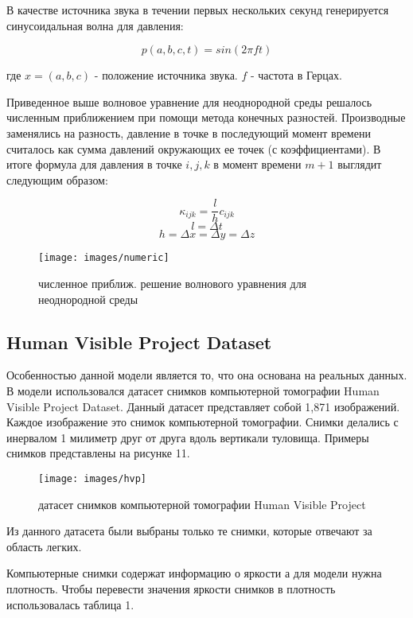 \documentclass[../main.tex]{subfiles}
\begin{document}
В качестве источника звука в течении первых нескольких секунд генерируется синусоидальная волна для давления:

$$p(a, b, c, t) = sin(2 \pi f t)$$

где $x = (a, b, c)$ - положение источника звука. $f$ - частота в Герцах.

Приведенное выше волновое уравнение для неоднородной среды решалось численным приближением при помощи метода конечных разностей. Производные заменялись на разность, давление в точке в последующий момент времени считалось как сумма давлений окружающих ее точек (с коэффициентами). В итоге формула для давления в точке $i, j, k$ в момент времени $m + 1$ выглядит следующим образом:

$$\kappa_{ijk} = \frac{l}{h}c_{ijk}$$
$$l = \Delta t$$
$$h = \Delta x = \Delta y = \Delta z$$

\begin{figure}[H]
\centering
\texttt{[image: images/numeric]}
\caption{численное приближ. решение волнового уравнения для неоднородной среды}
\end{figure}

\subsection{Human Visible Project Dataset}
Особенностью данной модели является то, что она основана на реальных данных. В модели использовался датасет снимков компьютерной томографии Human Visible Project Dataset. Данный датасет представляет собой 1,871 изображений. Каждое изображение это снимок компьютерной томографии. Снимки делались с инервалом 1 милиметр друг от друга вдоль вертикали туловища. Примеры снимков представлены на рисунке 11.

\begin{figure}[H]
\centering
\texttt{[image: images/hvp]}
\caption{датасет снимков компьютерной томографии Human Visible Project}
\end{figure}
Из данного датасета были выбраны только те снимки, которые отвечают за область легких.

Компьютерные снимки содержат информацию о яркости а для модели нужна плотность. Чтобы перевести значения яркости снимков в плотность использовалась таблица 1.
\end{document}
